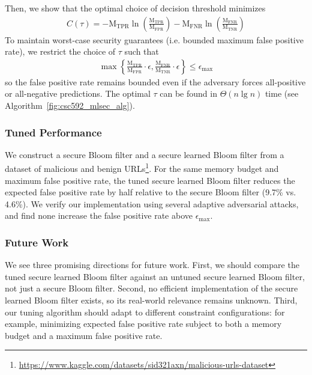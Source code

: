\noindent 
Then, we show that the optimal choice of decision threshold minimizes 
\begin{align*}
    C(\tau) = -\text{M}_\text{TPR} \ln \left( \frac{\text{M}_\text{TPR}}{\text{M}_\text{FPR}} \right) 
 - \text{M}_\text{FNR} \ln \left( \frac{\text{M}_\text{FNR}}{\text{M}_\text{TNR}}\right)
\end{align*}
To maintain worst-case security guarantees (i.e. bounded maximum false positive rate), we restrict the choice of $\tau$ such that 
\begin{align*}
    \max\left\{\frac{\text{M}_\text{TPR}}{\text{M}_\text{FPR}} \cdot \epsilon, \frac{\text{M}_\text{FNR}}{\text{M}_\text{TNR}} \cdot \epsilon  \right\} \leq \epsilon_\text{max}
\end{align*}
so the false positive rate remains bounded even if the adversary forces all-positive or all-negative predictions. The optimal $\tau$ can be found in 
$\Theta(n \lg n)$ time (see Algorithm~\ref{fig:csc592_mlsec_alg}). \\



\subsubsection{Tuned Performance}

We construct a secure Bloom filter and a secure learned Bloom filter from a dataset of malicious and benign 
URLs\footnote{\url{https://www.kaggle.com/datasets/sid321axn/malicious-urls-dataset}}. For the same memory budget and maximum false positive rate, the tuned 
secure learned Bloom filter reduces the expected false positive rate by half relative to the secure Bloom filter (9.7\% vs. 4.6\%). We verify our implementation
using several adaptive adversarial attacks, and find none increase the false positive rate above $\epsilon_\mathrm{max}$. 

\subsubsection{Future Work}

We see three promising directions for future work. First, we should compare the tuned secure learned Bloom filter against an untuned secure learned Bloom 
filter, not just a secure Bloom filter. Second, no efficient implementation of the secure learned Bloom filter exists, so its real-world relevance remains 
unknown. Third, our tuning algorithm should adapt to different constraint configurations: for example, minimizing expected false positive rate subject to both 
a memory budget and a maximum false positive rate.  

